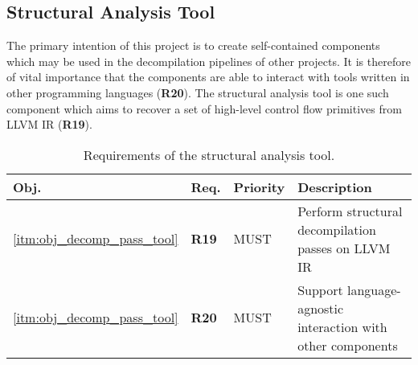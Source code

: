 
\subsection{Structural Analysis Tool}

The primary intention of this project is to create self-contained components which may be used in the decompilation pipelines of other projects. It is therefore of vital importance that the components are able to interact with tools written in other programming languages (\textbf{R20}). The structural analysis tool is one such component which aims to recover a set of high-level control flow primitives from LLVM IR (\textbf{R19}).

\begin{table}[htbp]
	\begin{center}
		\begin{tabular}{|l|l|l|l|}
			\hline
			Obj. & Req. & Priority & Description \\
			\hline
			\ref{itm:obj_decomp_pass_tool} & \textbf{R19} & MUST & Perform structural decompilation passes on LLVM IR \\
			\ref{itm:obj_decomp_pass_tool} & \textbf{R20} & MUST & Support language-agnostic interaction with other components \\
			\hline
		\end{tabular}
	\end{center}
	\caption{Requirements of the structural analysis tool.}
\end{table}
